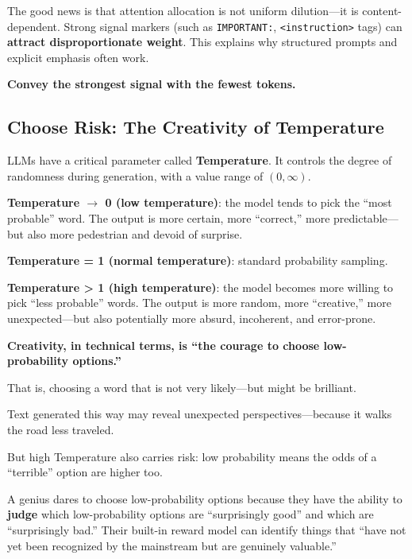 The good news is that attention allocation is not uniform dilution---it is content-dependent. Strong signal markers (such as \texttt{IMPORTANT:}, \texttt{<instruction>} tags) can \textbf{attract disproportionate weight}. This explains why structured prompts and explicit emphasis often work.

\vspace{1em}

\textbf{Convey the strongest signal with the fewest tokens.}

\newpage
\subsection{Choose Risk: The Creativity of Temperature}

LLMs have a critical parameter called \textbf{Temperature}. It controls the degree of randomness during generation, with a value range of $(0, \infty)$.

\textbf{Temperature $\to$ 0 (low temperature)}: the model tends to pick the ``most probable'' word. The output is more certain, more ``correct,'' more predictable---but also more pedestrian and devoid of surprise.

\textbf{Temperature = 1 (normal temperature)}: standard probability sampling.

\textbf{Temperature > 1 (high temperature)}: the model becomes more willing to pick ``less probable'' words. The output is more random, more ``creative,'' more unexpected---but also potentially more absurd, incoherent, and error-prone.

\vspace{1em}

\textbf{Creativity, in technical terms, is ``the courage to choose low-probability options.''}

That is, choosing a word that is not very likely---but might be brilliant.

Text generated this way may reveal unexpected perspectives---because it walks the road less traveled.

\vspace{1em}

But high Temperature also carries risk: low probability means the odds of a ``terrible'' option are higher too.


A genius dares to choose low-probability options because they have the ability to \textbf{judge} which low-probability options are ``surprisingly good'' and which are ``surprisingly bad.'' Their built-in reward model can identify things that ``have not yet been recognized by the mainstream but are genuinely valuable.''

